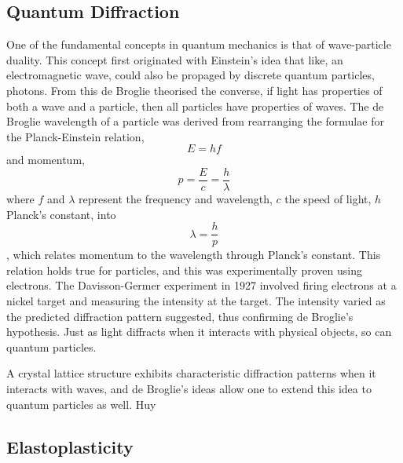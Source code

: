 \documentclass[11pt, oneside]{article}   	%
\begin{document}
\subsection{Quantum Diffraction}
One of the fundamental concepts in quantum mechanics is that of wave-particle duality. This concept first originated with Einstein's idea that like, an electromagnetic wave, could also be propaged by discrete quantum particles, photons. From this de Broglie theorised the converse, if light has properties of both a wave and a particle, then all particles have properties of waves. The de Broglie wavelength of a particle was derived from rearranging the formulae for the Planck-Einstein relation, \[E=hf\] and momentum, \[p=\frac{E}{c}=\frac{h}{\lambda}\] where $f$ and $\lambda$ represent the frequency and wavelength, $c$ the speed of light, $h$ Planck's constant, into \[\lambda=\frac{h}{p}\], which relates momentum to the wavelength through Planck's constant. This relation holds true for particles, and this was experimentally proven using electrons. The Davisson-Germer experiment in 1927 involved firing electrons at a nickel target and measuring the intensity at the target. The intensity varied as the predicted diffraction pattern suggested, thus confirming de Broglie's hypothesis. Just as light diffracts when it interacts with physical objects, so can quantum particles.

A crystal lattice structure exhibits characteristic diffraction patterns when it interacts with waves, and de Broglie's ideas allow one to extend this idea to quantum particles as well. Huy%
\subsection{Elastoplasticity}
\end{document}

